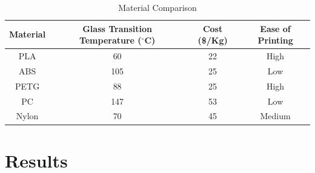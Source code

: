 \documentclass[12pt]{report}
\begin{document}
        \begin{table}[H]
            \centering
            \begin{tabular}{|c|c|c|c|}
            \hline
            Material & Glass Transition Temperature ($^{\circ}$C)& Cost (\$/Kg) & Ease of Printing   \\
            \hline
              PLA   & 60 & 22  & High \\ \hline
              ABS     & 105  &  25 & Low\\ \hline
              PETG     & 88 & 25 & High\\ \hline
              PC     & 147 & 53  & Low\\ \hline
              Nylon   & 70 & 45  & Medium\\
              \hline
            \end{tabular}
            \caption{Material Comparison}
            \label{tab:MaterialsTable}
        \end{table}
\chapter{Results}\label{chap:Results}
\end{document}
